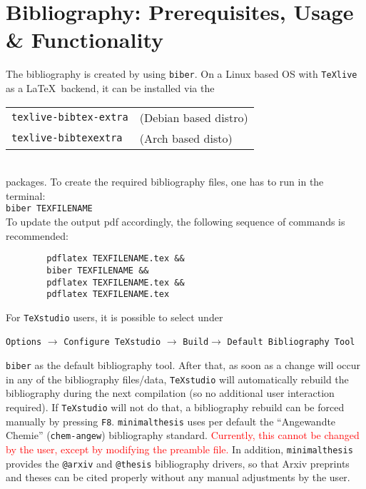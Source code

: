 \documentclass{./class/minimalthesis}
\begin{document}
	\chapter{Bibliography: Prerequisites, Usage \& Functionality}
	The bibliography is created by using \verb|biber|. On a Linux based OS with \verb|TeXlive| as a \LaTeX~backend, it can be installed via the\\[0.125cm]
	\begin{tabular}{ll}
		\verb|texlive-bibtex-extra|& (Debian based distro)\\
		\verb|texlive-bibtexextra|& (Arch based disto)
	\end{tabular}\\
	packages.
	\newline To create the required bibliography files, one has to run in the terminal:\\
	\verb|biber TEXFILENAME|\\
	To update the output pdf accordingly, the following sequence of commands is recommended:\\[-1cm]
	\begin{verbatim}
		pdflatex TEXFILENAME.tex &&
		biber TEXFILENAME &&
		pdflatex TEXFILENAME.tex &&
		pdflatex TEXFILENAME.tex 
	\end{verbatim} 
	\vspace{-0.5cm}
	For \verb|TeXstudio| users, it is possible to select under\\[-1cm]
	\begin{center}
		\verb|Options| $\rightarrow$ 
		\verb|Configure TeXstudio| $\rightarrow$
		\verb|Build|$ \rightarrow$
		\verb|Default Bibliography Tool| 
	\end{center}
	\vspace{-0.5cm}
	\verb|biber| as the default bibliography tool. After that, as soon as a change will occur in any of the bibliography files/data, \verb|TeXstudio| will automatically rebuild the bibliography during the next compilation (so no additional user interaction required). If \verb|TeXstudio| will not do that, a bibliography rebuild can be forced manually by pressing \verb|F8|.
	\newline \verb|minimalthesis| uses per default the \enquote{Angewandte Chemie} (\verb|chem-angew|) bibliography standard. \textcolor{red}{Currently, this cannot be changed by the user, except by modifying the preamble file.} 
	\newline In addition, \verb|minimalthesis| provides the \verb|@arxiv| \cite{arxivExample} and \verb|@thesis| \cite{thesisExample} bibliography drivers, so that Arxiv preprints and theses can be cited properly without any manual adjustments by the user.
	
\end{document}
